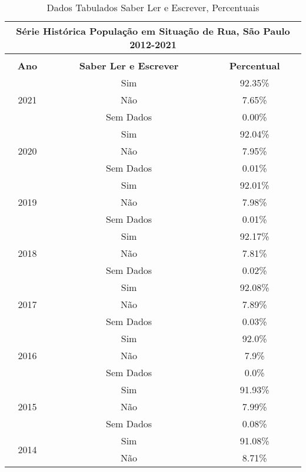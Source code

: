 \documentclass[14pt]{extarticle}
\begin{document}
\begin{table}[htbp]
  \centering
  \caption{Dados Tabulados Saber Ler e Escrever, Percentuais}
   \tabcolsep=0.15cm
	\renewcommand{\arraystretch}{1.0}
	\begin{adjustbox}{max width=\linewidth}
    \begin{tabular}{ccc}
    \toprule
    \multicolumn{3}{c}{Série Histórica População em Situação de Rua, São Paulo 2012-2021} \\
    \midrule
         &      &  \\
    \midrule
    \rowcolor[rgb]{ .906,  .902,  .902} \textbf{Ano} & \textbf{Saber Ler e Escrever} & \textbf{Percentual} \\
    \midrule
    \multirow{3}[2]{*}{2021} & Sim  & 92.35\% \\
         & Não  & 7.65\% \\
         & Sem Dados & 0.00\% \\
    \midrule
    \multirow{3}[2]{*}{2020} & Sim  & 92.04\% \\
         & Não  & 7.95\% \\
         & Sem Dados & 0.01\% \\
    \midrule
    \multirow{3}[2]{*}{2019} & Sim  & 92.01\% \\
         & Não  & 7.98\% \\
         & Sem Dados & 0.01\% \\
    \midrule
    \multirow{3}[2]{*}{2018} & Sim  & 92.17\% \\
         & Não  & 7.81\% \\
         & Sem Dados & 0.02\% \\
    \midrule
    \multirow{3}[2]{*}{2017} & Sim  & 92.08\% \\
         & Não  & 7.89\% \\
         & Sem Dados & 0.03\% \\
    \midrule
    \multirow{3}[2]{*}{2016} & Sim  & 92.0\% \\
         & Não  & 7.9\% \\
         & Sem Dados & 0.0\% \\
    \midrule
    \multirow{3}[2]{*}{2015} & Sim  & 91.93\% \\
         & Não  & 7.99\% \\
         & Sem Dados & 0.08\% \\
    \midrule
    \multirow{3}[2]{*}{2014} & Sim  & 91.08\% \\
         & Não  & 8.71\% \\

\end{tabular}
\end{adjustbox}
\end{table}
\end{document}

